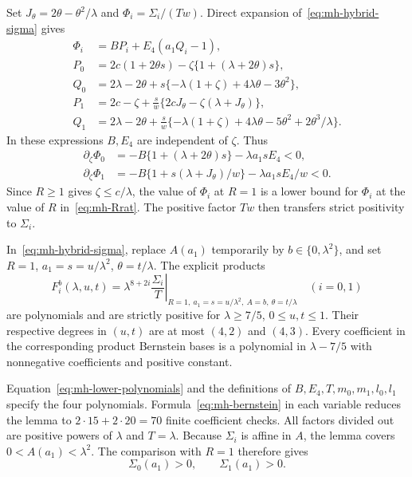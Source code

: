 Set $J_\theta=2\theta-\theta^2/\lambda$ and $\Phi_i=\Sigma_i/(Tw)$. Direct expansion of~\eqref{eq:mh-hybrid-sigma} gives
\begin{align*}
 \Phi_i&=BP_i+E_4(a_1Q_i-1),\\
 P_0&=2c(1+2\theta s)-\zeta\{1+(\lambda+2\theta)s\},\\
 Q_0&=2\lambda-2\theta+s\{-\lambda(1+\zeta)+4\lambda\theta-3\theta^2\},\\
 P_1&=2c-\zeta+\frac{s}{w}\{2cJ_\theta-\zeta(\lambda+J_\theta)\},\\
 Q_1&=2\lambda-2\theta+
 \frac{s}{w}\{-\lambda(1+\zeta)+4\lambda\theta-5\theta^2+2\theta^3/\lambda\}.
\end{align*}
In these expressions $B,E_4$ are independent of $\zeta$. Thus
\begin{align*}
 \partial_\zeta\Phi_0&=-B\{1+(\lambda+2\theta)s\}-\lambda a_1sE_4<0,\\
 \partial_\zeta\Phi_1&=-B\{1+s(\lambda+J_\theta)/w\}
                      -\lambda a_1sE_4/w<0.
\end{align*}
Since $R\ge1$ gives $\zeta\le c/\lambda$, the value of $\Phi_i$ at $R=1$ is a lower bound for $\Phi_i$ at the value of $R$ in~\eqref{eq:mh-Rrat}. The positive factor $Tw$ then transfers strict positivity to $\Sigma_i$.

\begin{lemma}[Coefficient inequalities at $s=a_1$]\label{lem:mh-lower-arithmetic}
In~\eqref{eq:mh-hybrid-sigma}, replace $A(a_1)$ temporarily by $b\in\{0,\lambda^2\}$, and set $R=1$, $a_1=s=u/\lambda^2$, $\theta=t/\lambda$. The explicit products
\begin{equation}\label{eq:mh-lower-polynomials}
 F_i^b(\lambda,u,t)
 =\lambda^{8+2i}\left.\frac{\Sigma_i}{T}\right|_{R=1,\ a_1=s=u/\lambda^2,\ A=b,\ \theta=t/\lambda}
 \quad(i=0,1)
\end{equation}
are polynomials and are strictly positive for $\lambda\ge7/5$, $0\le u,t\le1$. Their respective degrees in $(u,t)$ are at most $(4,2)$ and $(4,3)$. Every coefficient in the corresponding product Bernstein bases is a polynomial in $\lambda-7/5$ with nonnegative coefficients and positive constant.
\end{lemma}

Equation~\eqref{eq:mh-lower-polynomials} and the definitions of $B,E_4,T,m_0,m_1,l_0,l_1$ specify the four polynomials. Formula~\eqref{eq:mh-bernstein} in each variable reduces the lemma to $2\cdot15+2\cdot20=70$ finite coefficient checks. All factors divided out are positive powers of $\lambda$ and $T=\lambda$. Because $\Sigma_i$ is affine in $A$, the lemma covers $0<A(a_1)<\lambda^2$. The comparison with $R=1$ therefore gives
\begin{equation}\label{eq:mh-lower-positive}
 \Sigma_0(a_1)>0,\qquad\Sigma_1(a_1)>0.
\end{equation}

